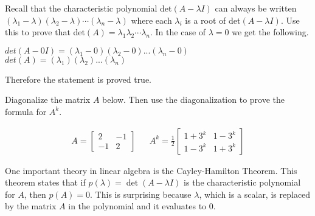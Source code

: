 \documentclass[]{exam}
\begin{document}
\begin{questions}

	\question Recall that the characteristic polynomial det$(A-\lambda I)$ can always be written $(\lambda_1 - \lambda)(\lambda_2 - \lambda) \cdots (\lambda_n - \lambda)$ where each $\lambda_i$ is a root of det$(A-\lambda I)$. Use this to prove that det$(A) = \lambda_1\lambda_2\cdots\lambda_n$.
	\newline
	In the case of $\lambda=0$ we get the following.
	\begin{center}
	    $det(A-0I)=(\lambda_1-0)(\lambda_2-0)...(\lambda_n-0)$
	    \newline
	    $det(A)=(\lambda_1)(\lambda_2)...(\lambda_n)$
	    \newline
	\end{center}
	Therefore the statement is proved true.

	\question Diagonalize the matrix $A$ below. Then use the diagonalization to prove the formula for $A^k$.
	
	\begin{align*}
		A = \begin{bmatrix}
		2 & -1 \\ -1 & 2
		\end{bmatrix} & &
		A^k = \frac{1}{2}\begin{bmatrix}
		1 + 3^k & 1 - 3^k \\ 1 - 3^k & 1 + 3^k
		\end{bmatrix}
	\end{align*}
	
	\question One important theory in linear algebra is the Cayley-Hamilton Theorem. This theorem states that if $p(\lambda) = \det(A-\lambda I)$ is the characteristic polynomial for $A$, then $p(A)=0$. This is surprising because $\lambda$, which is a scalar, is replaced by the matrix $A$ in the polynomial and it evaluates to 0. 
	

\end{questions}
\end{document}

